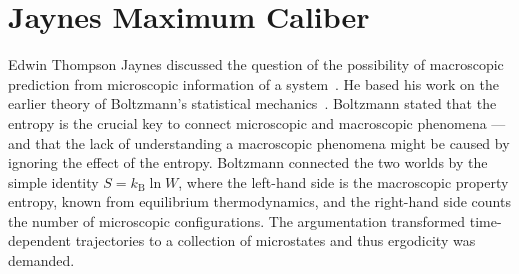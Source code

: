 % 
% 
% 
% 
% 
% 
%  

%

\chapter{Jaynes Maximum Caliber}
\label{ch:Jaynes}
Edwin Thompson Jaynes discussed the question of the possibility of macroscopic 
prediction from microscopic information of a system~\cite{jaynes1985macroscopic}. He based 
his work on the earlier theory of  Boltzmann's statistical 
mechanics~\cite{boltzmann1896vorlesungen}. Boltzmann stated that the entropy 
is the crucial key to connect microscopic and macroscopic phenomena --- and that the 
lack of understanding a macroscopic phenomena might be caused 
by ignoring the effect of the entropy. Boltzmann connected the two worlds by 
the simple identity $S = k_{\textrm{B}} \ln{W}$, where the 
left-hand side  is the macroscopic property entropy, known from equilibrium thermodynamics, and the right-hand side counts the number of microscopic 
configurations. The argumentation transformed time-dependent trajectories to a 
collection of microstates and thus ergodicity was demanded. 

